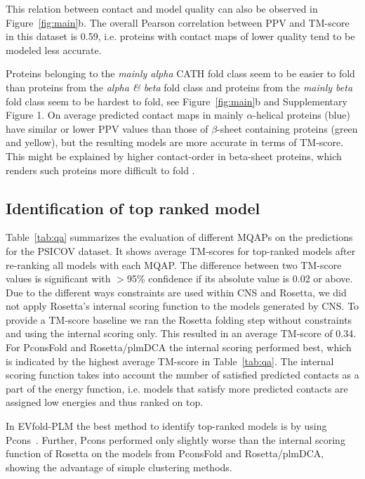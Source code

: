 \documentclass{bioinfo}
\begin{document}
This relation between contact and model quality can also be observed
in Figure~\ref{fig:main}b. The overall Pearson correlation between PPV and TM-score in
this dataset is 0.59, i.e. proteins with contact maps of lower quality tend
to be modeled less accurate. 


Proteins belonging to the {\it mainly alpha} CATH fold class seem to
be easier to fold than proteins from the {\it alpha \& beta} fold
class and proteins from the {\it mainly beta} fold class seem to be
hardest to fold, see Figure~\ref{fig:main}b {\color{red} and
Supplementary Figure 1}. On average predicted contact maps in
mainly $\alpha$-helical proteins (blue) have similar or lower PPV
values than those of $\beta$-sheet containing proteins (green and
yellow), but the resulting models are more accurate in terms of
TM-score. {\color{red}This might be explained by higher
contact-order \cite[]{Plaxco1998985} in beta-sheet proteins, which
renders such proteins more difficult to fold
\cite[]{bradley_improved_2006}.}




\subsection{Identification of top ranked model}

Table~\ref{tab:qa} summarizes the evaluation of different MQAPs on the
predictions for the PSICOV dataset. It shows average TM-scores for
top-ranked models after re-ranking all models with each MQAP.
{\color{red}The difference between two TM-score values is significant
with $>$95\% confidence if its absolute value is 0.02 or above.
Due to the different ways constraints are used within CNS and
Rosetta, we did not apply Rosetta's internal scoring function to
the models generated by CNS.} {\color{red}To provide a TM-score
baseline we ran the Rosetta folding step without constraints and
using the internal scoring only. This resulted in an average
TM-score of 0.34.} {\color{red}For PconsFold and Rosetta/plmDCA the
internal scoring performed best, which is indicated by the highest
average TM-score in Table~\ref{tab:qa}.} The internal scoring
function takes into account the number of satisfied predicted
contacts as a part of the energy function, i.e. models that
satisfy more predicted contacts are assigned low energies and thus
ranked on top.

In  EVfold-PLM the best method to identify top-ranked models is by
using Pcons~\cite[]{lundstrom_pcons:_2001}.
Further, Pcons performed only slightly worse than the internal scoring
function of Rosetta on the models from PconsFold and
Rosetta/plmDCA, showing the advantage of simple clustering methods.
\end{document}
